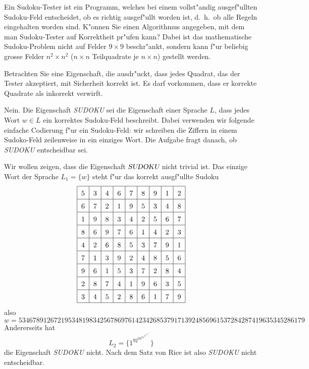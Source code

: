 Ein Sudoku-Tester ist ein Programm, welches bei einem vollst"andig
ausgef"ullten Sudoku-Feld entscheidet, ob es richtig ausgef"ullt
worden ist, d.~h.~ob alle Regeln eingehalten worden sind. K"onnen Sie
einen Algorithmus angegeben, mit dem man Sudoku-Tester auf Korrektheit
pr"ufen kann? Dabei ist das mathematische Sudoku-Problem nicht auf
Felder $9\times 9$ beschr"ankt, sondern kann f"ur beliebig grosse
Felder $n^2\times n^2$ ($n\times n$ Teilquadrate je $n\times n$)
gestellt werden.

\begin{hinweis}
Betrachten Sie eine Eigenschaft, die ausdr"uckt, dass
jedes Quadrat, das der Tester akzeptiert, mit Sicherheit korrekt
ist. Es darf vorkommen, dass er korrekte Quadrate als inkorrekt
verwirft.
\end{hinweis}

\begin{loesung}
Nein.  Die Eigenschaft \textsl{SUDOKU} sei die Eigenschaft einer
Sprache $L$, dass jedes Wort $w\in L$ ein korrektes Sudoku-Feld
beschreibt. Dabei verwenden wir folgende einfache
Codierung f"ur ein Sudoku-Feld: wir schreiben die Ziffern in
einem Sudoko-Feld zeilenweise in ein einziges Wort.
Die Aufgabe fragt danach, ob \textsl{SUDOKU} entscheidbar sei.

Wir wollen zeigen, dass die
Eigenschaft $\textsl{SUDOKU}$ nicht trivial ist.
Das einzige Wort der Sprache $L_1=\{w\}$  steht f"ur das korrekt
ausgf"ullte Sudoku
\[
\begin{tabular}{|c|c|c|c|c|c|c|c|c|}
\hline
\raisebox{0pt}[13pt][5pt]{5}&3&4&6&7&8&9&1&2\\
\hline
\raisebox{0pt}[13pt][5pt]{6}&7&2&1&9&5&3&4&8\\
\hline
\raisebox{0pt}[13pt][5pt]{1}&9&8&3&4&2&5&6&7\\
\hline
\raisebox{0pt}[13pt][5pt]{8}&6&9&7&6&1&4&2&3\\
\hline
\raisebox{0pt}[13pt][5pt]{4}&2&6&8&5&3&7&9&1\\
\hline
\raisebox{0pt}[13pt][5pt]{7}&1&3&9&2&4&8&5&6\\
\hline
\raisebox{0pt}[13pt][5pt]{9}&6&1&5&3&7&2&8&4\\
\hline
\raisebox{0pt}[13pt][5pt]{2}&8&7&4&1&9&6&3&5\\
\hline
\raisebox{0pt}[13pt][5pt]{3}&4&5&2&8&6&1&7&9\\
\hline
\end{tabular}
\]
also
\[
w=
534678912672195348198342567869761423426853791713924856961537284287419635345286179
\]
Andererseits hat
\[
L_2=\{1^92^93^94^95^96^97^98^99^9\}
\]
die Eigenschaft \textsl{SUDOKU} nicht. Nach dem Satz
von Rice ist also \textsl{SUDOKU} nicht entscheidbar.
\end{loesung}
